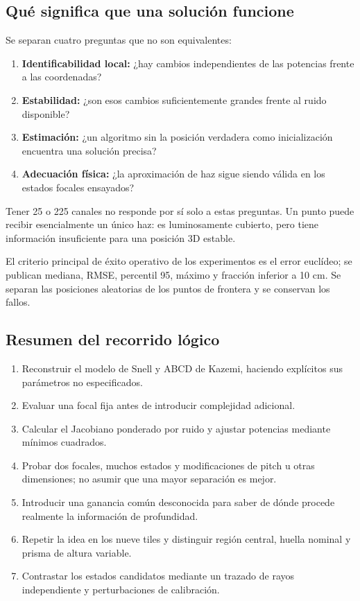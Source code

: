 \subsection{Qué significa que una solución funcione}
Se separan cuatro preguntas que no son equivalentes:
\begin{enumerate}
\item \textbf{Identificabilidad local:} ¿hay cambios independientes de las potencias frente a las coordenadas?
\item \textbf{Estabilidad:} ¿son esos cambios suficientemente grandes frente al ruido disponible?
\item \textbf{Estimación:} ¿un algoritmo sin la posición verdadera como inicialización encuentra una solución precisa?
\item \textbf{Adecuación física:} ¿la aproximación de haz sigue siendo válida en los estados focales ensayados?
\end{enumerate}
Tener 25 o 225 canales no responde por sí solo a estas preguntas. Un punto puede recibir esencialmente un único haz: es luminosamente cubierto, pero tiene información insuficiente para una posición 3D estable.

El criterio principal de éxito operativo de los experimentos es el error euclídeo; se publican mediana, RMSE, percentil 95, máximo y fracción inferior a 10 cm. Se separan las posiciones aleatorias de los puntos de frontera y se conservan los fallos.

\subsection{Resumen del recorrido lógico}
\begin{enumerate}
\item Reconstruir el modelo de Snell y ABCD de Kazemi, haciendo explícitos sus parámetros no especificados.
\item Evaluar una focal fija antes de introducir complejidad adicional.
\item Calcular el Jacobiano ponderado por ruido y ajustar potencias mediante mínimos cuadrados.
\item Probar dos focales, muchos estados y modificaciones de pitch u otras dimensiones; no asumir que una mayor separación es mejor.
\item Introducir una ganancia común desconocida para saber de dónde procede realmente la información de profundidad.
\item Repetir la idea en los nueve tiles y distinguir región central, huella nominal y prisma de altura variable.
\item Contrastar los estados candidatos mediante un trazado de rayos independiente y perturbaciones de calibración.
\end{enumerate}


